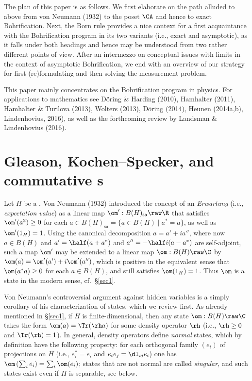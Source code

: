 \documentclass[12pt]{article}
\begin{document}
The plan of this paper is as follows. We first elaborate on the path alluded to above from von Neumann (1932) to the poset $\CA$ and hence to exact Bohrification. Next, 
 the Born rule provides a nice context for a first acquaintance with the Bohrification program in its two variants (i.e., exact and asymptotic), as it falls under both headings and hence may be understood from two rather different points of view.
After an intermezzo on  conceptual issues with limits in the context of  asymptotic  Bohrification, we  end with an overview of our strategy for first (re)formulating and then solving the measurement problem. 

This paper mainly concentrates on the Bohrification program in  physics. For applications to mathematics see  D\"{o}ring \& Harding (2010), Hamhalter (2011), Hamhalter \& Turilova (2013), Wolters (2013),   D\"{o}ring (2014), Heunen (2014a,b),  Lindenhovius, 2016), as well as the forthcoming review by
 Landsman \& Lindenhovius (2016).
  \section{Gleason, Kochen--Specker, and commutative \ca s}\label{GKS}
Let $H$ be a \Hs.  Von Neumann (1932) introduced the  concept of an \emph{Erwartung} (i.e., \emph{expectation value}) as a linear map $\om':B(H)_{\mathrm{sa}}\raw\R$ that satisfies $\om'(a^2)\geq 0$ for each $a\in B(H)_{\mathrm{sa}}=\{a\in B(H)\mid a^*=a\}$, as well as $\om'(1_H)=1$.
Using the canonical decomposition $a=a'+ia''$, where now $a\in B(H)$ and 
  $a'= \half (a+a^*)$ and $a''=-\half i(a-a^*)$ are self-adjoint, such a map $\om'$ may be extended to a linear map
  $\om:B(H)\raw\C$ by $\om(a)=\om'(a')+i\om'(a'')$, which is positive in the equivalent sense that $\om(a^*a)\geq 0$ for each $a\in B(H)$, and still satisfies $\om(1_H)=1$. Thus $\om$ is a state in the modern sense, cf.\ \S\ref{sec1}.
   
Von Neumann's controversial argument against hidden variables is a simply corollary of his characterization of states, which we review first.  As already mentioned in \S\ref{sec1}, if $H$ is finite-dimensional, then any state $\om:B(H)\raw\C$ takes the form
 $\om(a)=\Tr(\rh a)$ for some density operator $\rh$ (i.e., $\rh\geq 0$ and $\Tr(\rh)=1$). In general, density operators define \emph{normal} states, which by definition have the following property:  for each orthogonal family $(e_i)$ of projections on $H$ (i.e., $e_i^*=e_i$ and  $e_ie_j=\dl_{ij}e_i$) one has $\om\left(\sum_i e_i\right)=\sum_i\om(e_i)$; states that are not normal are called \emph{singular}, and such states exist even if $H$ is separable, see below. 
\end{document}
